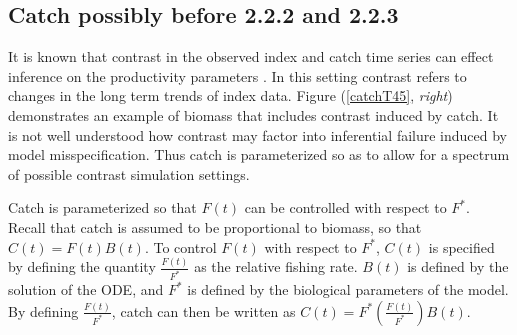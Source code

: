
%
\subsection{Catch \label{catch} {\color{red}possibly before 2.2.2 and 2.2.3}}


%
It is known that contrast in the observed index and catch time series %
can effect inference on the productivity parameters \cite{hilborn_quantitative_1992}. %
In this setting contrast refers to changes in the long term trends of index data.
Figure (\ref{catchT45}, \emph{right}) demonstrates an example of biomass that
includes contrast induced by catch. It is not well understood how contrast may
factor into inferential failure induced by model misspecification. Thus catch
is parameterized so as to allow for a spectrum of possible contrast simulation settings.

%
Catch is parameterized so that $F(t)$ can be controlled with respect to $F^*$.
Recall that catch is assumed to be proportional to biomass, so that $C(t)=F(t)B(t)$.
To control $F(t)$ with respect to $F^*$, $C(t)$ is specified by defining the
quantity $\frac{F(t)}{F^*}$ as the relative fishing rate. $B(t)$ is defined
by the solution of the ODE, and $F^*$ is defined by the biological parameters
of the model. By defining $\frac{F(t)}{F^*}$, catch can then be written as
\mbox{$C(t)=F^*\left(\frac{F(t)}{F^*}\right)B(t)$.}

